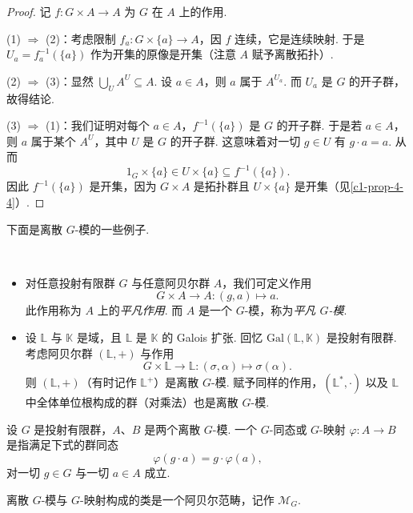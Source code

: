 \begin{proof}
记 $f:G\times A\to A$ 为 $G$ 在 $A$ 上的作用.

(1) $\Rightarrow$ (2)：考虑限制 $f_a:G\times\{a\}\to A$，因 $f$ 连续，它是连续映射. 于是 $U_a=f_a^{-1}(\{a\})$ 作为开集的原像是开集（注意 $A$ 赋予离散拓扑）.

(2) $\Rightarrow$ (3)：显然 $\bigcup_U A^U\subseteq A$. 设 $a\in A$，则 $a$ 属于 $A^{U_a}$. 而 $U_a$ 是 $G$ 的开子群，故得结论.

(3) $\Rightarrow$ (1)：我们证明对每个 $a\in A$，$f^{-1}(\{a\})$ 是 $G$ 的开子群. 于是若 $a\in A$，则 $a$ 属于某个 $A^U$，其中 $U$ 是 $G$ 的开子群. 这意味着对一切 $g\in U$ 有 $g\cdot a=a$. 从而
\[
1_G\times\{a\}\in U\times\{a\}\subseteq f^{-1}(\{a\}).
\]
因此 $f^{-1}(\{a\})$ 是开集，因为 $G\times A$ 是拓扑群且 $U\times\{a\}$ 是开集（见\autoref{c1-prop-4-4}）.
\end{proof}

下面是离散 $G$-模的一些例子.

\begin{examples}\label{c5-ex-1-3}
\
\begin{itemize}
    \item 对任意投射有限群 $G$ 与任意阿贝尔群 $A$，我们可定义作用
    \[
    G\times A\to A:(g,a)\mapsto a.
    \]
    此作用称为 $A$ 上的\emph{平凡作用}. 而 $A$ 是一个 $G$-模，称为\emph{平凡 $G$-模}.
    \item 设 $\mathbb{L}$ 与 $\mathbb{K}$ 是域，且 $\mathbb{L}$ 是 $\mathbb{K}$ 的 Galois 扩张. 回忆 $\mathrm{Gal}(\mathbb{L},\mathbb{K})$ 是投射有限群. 考虑阿贝尔群 $(\mathbb{L},+)$ 与作用
    \[
    G\times\mathbb{L}\to\mathbb{L}:(\sigma,\alpha)\mapsto\sigma(\alpha).
    \]
    则 $(\mathbb{L},+)$（有时记作 $\mathbb{L}^+$）是离散 $G$-模. 赋予同样的作用，$(\mathbb{L}^*,\cdot)$ 以及 $\mathbb{L}$ 中全体单位根构成的群（对乘法）也是离散 $G$-模.
\end{itemize}
\end{examples}

\begin{definition}\label{c5-def-1-4}
设 $G$ 是投射有限群，$A$、$B$ 是两个离散 $G$-模. 一个 $G$-同态或 $G$-映射 $\varphi:A\to B$ 是指满足下式的群同态
\[
\varphi(g\cdot a)=g\cdot\varphi(a),
\]
对一切 $g\in G$ 与一切 $a\in A$ 成立.
\end{definition}

\begin{remark}\label{c5-rem-1-5}
离散 $G$-模与 $G$-映射构成的类是一个阿贝尔范畴，记作 $\mathscr{M}_G$.
\end{remark}

